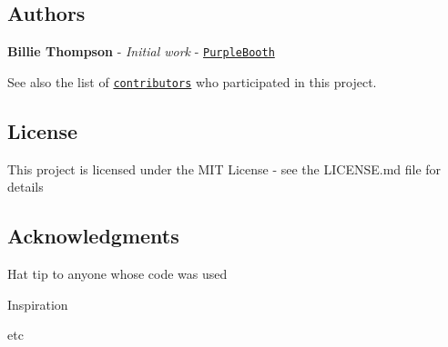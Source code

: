 \subsection*{Authors}


\begin{DoxyItemize}
\item {\bfseries Billie Thompson} -\/ {\itshape Initial work} -\/ \href{https://github.com/PurpleBooth}{\tt Purple\+Booth}
\end{DoxyItemize}

See also the list of \href{https://github.com/your/project/contributors}{\tt contributors} who participated in this project.

\subsection*{License}

This project is licensed under the M\+IT License -\/ see the L\+I\+C\+E\+N\+SE.md file for details

\subsection*{Acknowledgments}


\begin{DoxyItemize}
\item Hat tip to anyone whose code was used
\item Inspiration
\item etc 
\end{DoxyItemize}